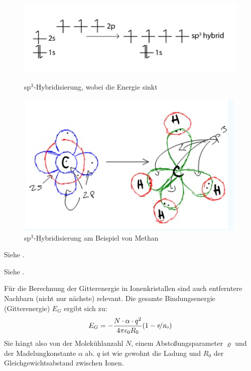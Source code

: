 \begin{itemize}
          \begin{figure}[H]
            \begin{minipage}[b]{0.5\linewidth} 
               \includegraphics[width=0.8\linewidth]{resources/28-11-2018/sp31.PNG}
               \caption{sp$^3$-Hybridisierung, wobei die Energie sinkt}
            \end{minipage}
            \hspace{0.01\linewidth}
            \begin{minipage}[b]{0.5\linewidth} 
               \includegraphics[width=0.8\linewidth]{resources/28-11-2018/sp32.PNG}
               \caption{sp$^3$-Hybridisierung am Beispiel von Methan}
            \end{minipage}
         \end{figure}

\end{itemize}

\label{q:63}

Siehe .

\label{q:64}

Siehe .

\label{q:65}

Für die Berechnung der Gitterenergie in Ionenkristallen sind auch entferntere Nachbarn (nicht nur nächste) relevant. 
Die gesamte Bindungsenergie (Gitterenergie) $E_G$ ergibt sich zu: 
\[E_G = -\frac{N\cdot \alpha \cdot q^2}{4\pi\epsilon_0 R_0}(1-\nicefrac{\varrho}{R_0})\]
Sie hängt also von der Molekühlanzahl $N$, einem Abstoßungsparameter $\varrho$ und der Madelungkonstante $\alpha$ ab. $q$ ist wie gewohnt die Ladung und $R_0$ der Gleichgewichtsabstand zwischen Ionen. 

